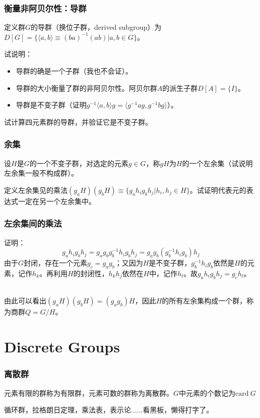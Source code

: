 \documentclass[CJK]{beamer}
\newcommand{\card}{\mathrm{card \ }}
\begin{document}
\begin{frame}
\frametitle{\bch 衡量非阿贝尔性：导群 \ech}
\bch
定义群$G$的导群（换位子群，derived subgroup）为$D[G] = \{ \langle a,b \rangle \equiv (ba)^{-1} (ab) | a,b \in G \}$。\par
试说明：
\begin{itemize}
\item 导群的确是一个子群（我也不会证）。
\item 导群的大小衡量了群的非阿贝尔性。阿贝尔群$A$的派生子群$D[A] = \{I\}$。
\item 导群是不变子群（证明$g^{-1} \langle a,b \rangle g = \langle g^{-1} a g , g^{-1} b g \rangle$）。
\end{itemize}
试计算四元素群的导群，并验证它是不变子群。

\ech
\end{frame}


\begin{frame}
\frametitle{\bch 余集 \ech}
\bch
设$H$是$G$的一个不变子群，对选定的元素$g \in G$，称$gH$为$H$的一个左余集（试说明左余集一般不构成群）。
\par
定义左余集见的乘法$(g_a H) (g_b H) \equiv \{ g_a h_i g_b h_j | h_i,h_j \in H\}$。试证明代表元的表达式一定在另一个左余集中。


\ech
\end{frame}

\begin{frame}
\frametitle{\bch 左余集间的乘法 \ech}
\bch
证明：{\blue 
$$ g_a h_i g_b h_j = g_a g_b g_b^{-1} h_i g_b h_j = g_a g_b (g_b^{-1} h_i g_b ) h_j$$
由于$G$封闭，存在一个元素$g_c = g_a g_b$；又因为$H$是不变子群，$g_b^{-1} h_i g_b$依然是$H$的元素，记作$h_k$。再利用$H$的封闭性，$h_k h_j$依然在$H$中，记作$h_l$。故$g_a h_i g_b h_j = g_c h_l$。 }
\par \ \\
由此可以看出$(g_a H) (g_b H) = (g_a g_b) H$，因此$H$的所有左余集构成一个群，称为商群$Q = G/H$。


\ech
\end{frame}





\section{Discrete Groups}
\begin{frame}
\frametitle{\bch 离散群 \ech}
\bch
元素有限的群称为有限群，元素可数的群称为离散群。$G$中元素的个数记为$\card G$\par
循环群，拉格朗日定理，乘法表，表示论......看黑板，懒得打字了。


\ech
\end{frame}
\end{document}
